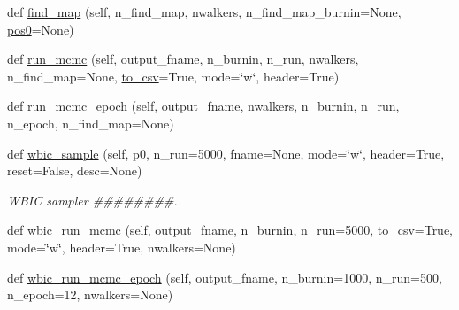 \begin{DoxyCompactItemize}
def \hyperlink{classsampler_1_1Sampler_ad7ddd812810028fad49c18ba7270f23f}{find\+\_\+map} (self, n\+\_\+find\+\_\+map, nwalkers, n\+\_\+find\+\_\+map\+\_\+burnin=None, \hyperlink{classsampler_1_1Sampler_ad81b8f4bc5bc8925873719991006acd8}{pos0}=None)
\item 
def \hyperlink{classsampler_1_1Sampler_ab35f387d6b11e001d006731559e09f56}{run\+\_\+mcmc} (self, output\+\_\+fname, n\+\_\+burnin, n\+\_\+run, nwalkers, n\+\_\+find\+\_\+map=None, \hyperlink{classsampler_1_1Sampler_a57168d6c5801b89109e2a2cd7d7ff4ce}{to\+\_\+csv}=True, mode=\char`\"{}w\char`\"{}, header=True)
\item 
def \hyperlink{classsampler_1_1Sampler_a93e39e8143affeb3572fdf024bf2d12b}{run\+\_\+mcmc\+\_\+epoch} (self, output\+\_\+fname, nwalkers, n\+\_\+burnin, n\+\_\+run, n\+\_\+epoch, n\+\_\+find\+\_\+map=None)
\item 
def \hyperlink{classsampler_1_1Sampler_ad07e2a415fe1c3890c6f6efcfe7515db}{wbic\+\_\+sample} (self, p0, n\+\_\+run=5000, fname=None, mode=\char`\"{}w\char`\"{}, header=True, reset=False, desc=None)
\begin{DoxyCompactList}\small\item\em W\+B\+IC sampler \#\#\#\#\#\#\#\#. \end{DoxyCompactList}\item 
def \hyperlink{classsampler_1_1Sampler_aa26f751fdfe25f8b8fcc450d09ace641}{wbic\+\_\+run\+\_\+mcmc} (self, output\+\_\+fname, n\+\_\+burnin, n\+\_\+run=5000, \hyperlink{classsampler_1_1Sampler_a57168d6c5801b89109e2a2cd7d7ff4ce}{to\+\_\+csv}=True, mode=\char`\"{}w\char`\"{}, header=True, nwalkers=None)
\item 
def \hyperlink{classsampler_1_1Sampler_a5e76a78ad9e222e49f77a4d2e6c23c04}{wbic\+\_\+run\+\_\+mcmc\+\_\+epoch} (self, output\+\_\+fname, n\+\_\+burnin=1000, n\+\_\+run=500, n\+\_\+epoch=12, nwalkers=None)
\end{DoxyCompactItemize}
